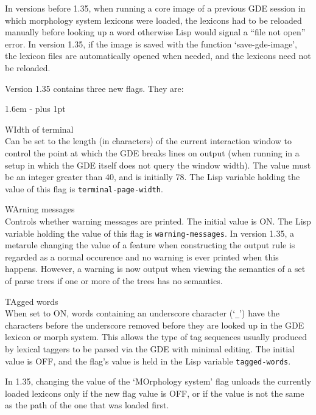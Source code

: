 In versions before 1.35, when running a core image of a previous GDE session
in which morphology system lexicons were loaded, the lexicons had to be 
reloaded manually before looking up a word otherwise Lisp would signal a
``file not open'' error. In version 1.35,
if the image is saved with the function `save-gde-image', the lexicon files
are automatically opened when needed, and the lexicons need not be 
reloaded.

Version 1.35 contains three new flags. They are:

\newcommand{\gdeflag}[2]{\item #1\\
#2}

\begin{list}{}
   {\leftmargin 1.6em
    \itemindent -\leftmargin
    \parsep 0pt plus 1pt}

\gdeflag{WIdth of terminal} {Can be set to the length (in characters) of
the current interaction window to control the point at which the GDE breaks
lines on output (when running in a setup in which the GDE itself does not
query the window width). The value must be an integer greater than 40, and is
initially 78. The Lisp variable holding the value of this flag is
{\tt *terminal-page-width}.}

\gdeflag{WArning messages} {Controls whether warning messages are
printed. The initial value is ON. The Lisp variable holding the value
of this flag is {\tt *warning-messages}. In version 1.35, a metarule
changing the value of a feature when constructing the output
rule is regarded as a normal occurence and no warning is ever printed
when this happens. However, a warning is now output when viewing the
semantics of a set of parse trees if one or more of the trees has no
semantics.}

\gdeflag{TAgged words} {When set to ON, words containing an underscore
character (`{\tt \_}') have the characters before the underscore removed before
they are looked up in the GDE lexicon or morph system. This allows the type of
tag sequences usually produced by lexical taggers to be parsed via the GDE
with minimal editing. The initial value is OFF, and the flag's value is
held in the Lisp variable {\tt *tagged-words}.}
\end{list}

In 1.35, changing the value of the `MOrphology system' flag unloads the
currently loaded lexicons only if the new flag value is OFF, or if the value
is not the same as the path of the one that was loaded first.


